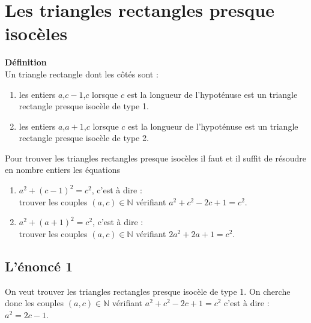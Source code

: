 \documentclass[a4paper,11pt]{book}
\newcommand{\N}{{\mathbb{N}}}
\begin{document}
\section{Les triangles rectangles presque isoc\`eles}
{\bf D\'efinition}\\
Un triangle rectangle  dont les 
c\^ot\'es sont :
\begin{enumerate}
\item les entiers $a$,$c-1$,$c$ lorsque $c$ est la longueur de 
l'hypot\'enuse est un triangle rectangle presque isoc\`ele de type 1.\\
\item les entiers $a$,$a+1$,$c$ lorsque $c$ est la longueur de 
l'hypot\'enuse est un triangle rectangle presque isoc\`ele de type 2.\\
\end{enumerate}
Pour trouver les triangles rectangles presque isoc\`eles il faut et il suffit 
de r\'esoudre en nombre entiers les \'equations 
\begin{enumerate}
\item $a^2+(c-1)^2=c^2$, c'est \`a dire :\\
trouver les couples $(a,c)\in \N$ v\'erifiant $a^2+c^2-2c+1=c^2$.\\
\item $a^2+(a+1)^2=c^2$, 
c'est \`a dire :\\
trouver les couples $(a,c)\in \N$ v\'erifiant $2a^2+2a+1=c^2$.\\
\end{enumerate}
\subsection{L'\'enonc\'e 1}
On veut trouver les triangles rectangles presque isoc\`ele de type 1.
On cherche donc les couples $(a,c)\in \N$ v\'erifiant $a^2+c^2-2c+1=c^2$ c'est 
\`a dire :\\
$a^2=2c-1$.\\
\end{document}
